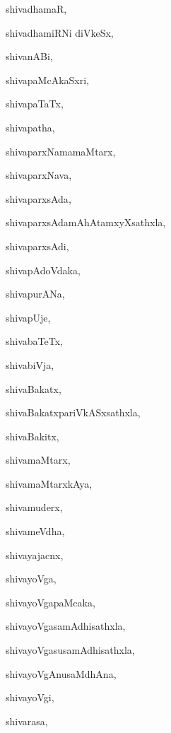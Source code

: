 \begin{multicols}{2}
{shivadhamaR}, \pageref{shivadhamaR}

{shivadhamiRNi diVkeSx}, \pageref{shivadhamiRNidiVkeSx}

{shivanABi}, \pageref{shivanABi}

{shivapaMcAkaSxri}, \pageref{shivapaMcAkaSxri}

{shivapaTaTx}, \pageref{shivapaTaTx}

{shivapatha}, \pageref{shivapatha}

{shivaparxNamamaMtarx}, \pageref{shivaparxNamamaMtarx}

{shivaparxNava}, \pageref{shivaparxNava}

{shivaparxsAda}, \pageref{shivaparxsAda}

{shivaparxsAdamAhAtamxyXsathxla}, \pageref{shivaparxsAdamAhAtamxyXsathxla}

{shivaparxsAdi}, \pageref{shivaparxsAdi}

{shivapAdoVdaka}, \pageref{shivapAdoVdaka}

{shivapurANa}, \pageref{shivapurANa}

{shivapUje}, \pageref{shivapUje}

{shivabaTeTx}, \pageref{shivabaTeTx}

{shivabiVja}, \pageref{shivabiVja}

{shivaBakatx}, \pageref{shivaBakatx}

{shivaBakatxpariVkASxsathxla}, \pageref{shivaBakatxpariVkASxsathxla}

{shivaBakitx}, \pageref{shivaBakitx}

{shivamaMtarx}, \pageref{shivamaMtarx}

{shivamaMtarxkAya}, \pageref{shivamaMtarxkAya}

{shivamuderx}, \pageref{shivamuderx}

{shivameVdha}, \pageref{shivameVdha}

{shivayajacnx}, \pageref{shivayajacnx}

{shivayoVga}, \pageref{shivayoVga}

{shivayoVgapaMcaka}, \pageref{shivayoVgapaMcaka}

{shivayoVgasamAdhisathxla}, \pageref{shivayoVgasamAdhisathxla}

{shivayoVgasusamAdhisathxla}, \pageref{shivayoVgasusamAdhisathxla}

{shivayoVgAnusaMdhAna}, \pageref{shivayoVgAnusaMdhAna}

{shivayoVgi}, \pageref{shivayoVgi}

{shivarasa}, \pageref{shivarasa}


\end{multicols}

